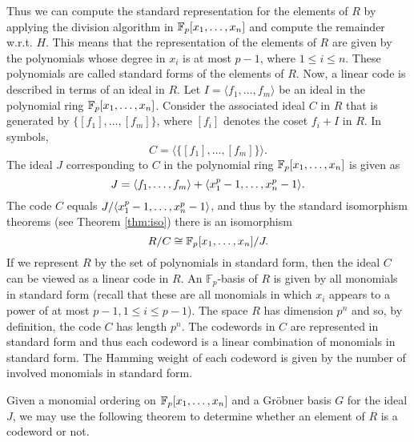 \documentclass[english,bachelor]{liumaiex}
\begin{document}
Thus we can compute the standard representation for the elements of $R$ by applying the division algorithm in $\mathbb{F}_p[x_1,\dots,x_n]$ and compute the remainder w.r.t. $H$. This means that the representation of the elements of $R$ are given by the polynomials whose degree in $x_i$ is at most $p-1$, where $1\leq i\leq n$. These polynomials are called standard forms of the elements of $R$. Now, a linear code is described in terms of an ideal in $R$. Let $I=\langle f_1,\dots,f_m\rangle$ be an ideal in the polynomial ring $\mathbb{F}_p[x_1,\dots,x_n]$. Consider the associated ideal $C$ in $R$ that is generated by $\{[f_1],\dots,[f_m]\}$, where $[f_i]$ denotes the coset $f_i+I$ in $R$. In symbols,
\begin{displaymath}
C = \langle\{[f_1],\dots,[f_m]\} \rangle.
\end{displaymath} 
The ideal $J$ corresponding to $C$ in the polynomial ring $\mathbb{F}_p[x_1,\dots,x_n]$ is given as
\begin{displaymath}
J=\langle f_1,\dots,f_m\rangle +\langle x_1^p-1,\dots,x_n^p-1\rangle.
\end{displaymath}
The code $C$ equals $J/\langle x_1^p-1,\dots,x_n^p-1\rangle$, and thus by the standard isomorphism theorems (see Theorem \ref{thm:iso}) there is an isomorphism
\begin{displaymath}
R/C\cong\mathbb{F}_p[x_1,\dots,x_n]/J.
\end{displaymath}
If we represent $R$ by the set of polynomials in standard form, then the ideal $C$ can be viewed as a linear code in $R$. An $\mathbb{F}_p$-basis of $R$ is given by all monomials in standard form (recall that these are all monomials in which $x_i$ appears to a power of at most $p-1, 1\leq i\leq p-1$). The space $R$ has dimension $p^n$ and so, by definition, the code $C$ has length $p^n$. The codewords in $C$ are represented in standard form and thus each codeword is a linear combination of monomials in standard form. The Hamming weight of each codeword is given by the number of involved monomials in standard form.

Given a monomial ordering on $\mathbb{F}_p[x_1,\dots,x_n]$ and a Gröbner basis $G$ for the ideal $J$, we may use the following theorem to determine whether an element of $R$ is a codeword or not.
\end{document}
